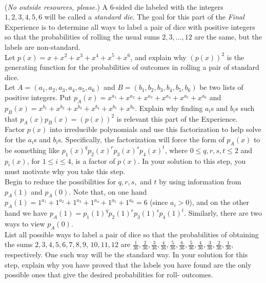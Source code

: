 \documentclass{article}
\begin{document}
\vspace{2em}
\noindent \underline{\hspace{5in}}
\newpage
\vspace{2em}
\\
\noindent(\emph{No outside resources, please.}) A 6-sided die labeled with the integers $1, 2, 3, 4, 5, 6$ will be called a \emph{standard die}.  The goal for this part of the \emph{Final} Experience is to determine all ways to label a pair of dice with positive integers so that the probabilities of rolling the usual sums $2, 3, \dots ,12$ are the same, but the labels are non-standard.  \\
  Let $p(x) = x+x^2+x^3+x^4+x^5+x^6$, and explain why $(p(x))^2$ is the generating function for the probabilities of outcomes in rolling a pair of standard dice.\\
  Let $A =(a_1, a_2, a_3, a_4, a_5, a_6)$ and $B = (b_1, b_2, b_3, b_4, b_5, b_6)$ be two lists of positive integers.  Put $p_A(x) = x^{a_1}+x^{a_2} + x^{a_3} + x^{a_4}+x^{a_5} + x^{a_6}$ and $p_B(x) = x^{b_1}+x^{b_2}+x^{b_3}+x^{b_4}+x^{b_5}+x^{b_6}$.  Explain why finding $a_i$s and $b_i$s such that $p_A(x)p_B(x) = (p(x))^2$ is relevant this part of the Experience.\\
  Factor $p(x)$ into irreducible polynomials and use this factorization to help solve for the $a_i$s and $b_i$s. Specifically, the factorization will force the form of $p_A(x)$ to be something like $p_1(x)^qp_2(x)^rp_3(x)^sp_4(x)^t$, where $0 \leq q,r,s,t \leq 2$ and $p_i(x)$, for $1 \leq i \leq 4$, is a factor of $p(x)$.  In your solution to this step, you must motivate why you take this step. \\
 Begin to reduce the possibilities for $q,r,s,$ and $t$ by using information from $p_A(1)$ and $p_A(0)$.  Note that, on one hand $p_A(1) = 1^{a_1} + 1^{a_2} + 1^{a_3} + 1^{a_4} + 1^{a_5}+1^{a_6} = 6$ (since $a_i > 0$), and on the other hand we have $p_A(1) = p_1(1)^qp_2(1)^rp_3(1)^sp_4(1)^t$.  Similarly, there are two ways to view $p_A(0)$.\\
 List all possible ways to label a pair of dice so that the probabilities of obtaining the sums $2, 3, 4, 5, 6, 7, 8, 9$, $10, 11, 12$ are $\frac{1}{36}, \frac{2}{36}, \frac{3}{36}, \frac{4}{36}, \frac{5}{36}, \frac{6}{36}, \frac{5}{36}, \frac{4}{36}, \frac{3}{36}, \frac{2} {36},\frac{1}{36}$, respectively.  One such way will be the standard way.  In your solution for this step, explain why you have proved that the labels you have found are the only possible ones that give the desired probabilities for roll- outcomes.
\end{document}
